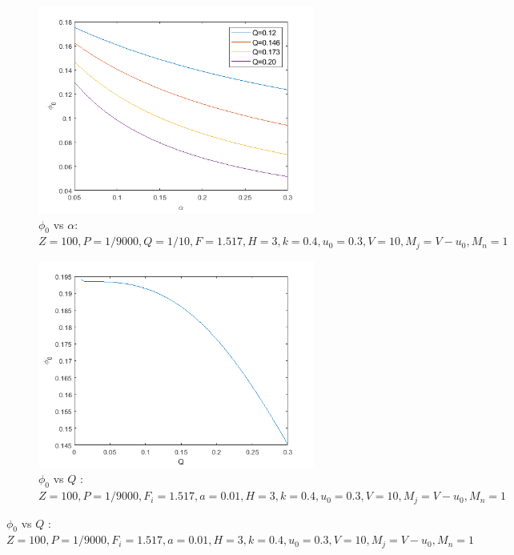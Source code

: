 \documentclass[journal]{IEEEtran}
\begin{document}
\begin{figure}
		\centering
		\begin{subfigure}[b]{1\linewidth}
			\includegraphics[width=\linewidth]{"kdv amplitude vs temp ratio"}
			\caption{$\phi_0$ vs $\alpha$: $Z = 100, P = 1/9000, Q = 1/10, F = 1.517, H = 3, k = 0.4, u_0 = 0.3, V = 10, M_j = V - u_0, M_n = 1$}
			\label{fig:fig5}
		\end{subfigure}
	
		\begin{subfigure}[b]{1\linewidth}
			\includegraphics[width=\linewidth]{"kdv amplitude vs ion dust mass ratio"}
			\caption{$\phi_0$ vs $Q$ :$ Z = 100, P = 1/9000,	F_i = 1.517, a = 0.01, H = 3, k = 0.4, u_0 = 0.3,	V = 10,	M_j = V - u_0, M_n = 1$}
		\end{subfigure}
	

\end{figure}
\end{document}

